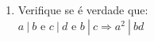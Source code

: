 \documentclass[a4paper,14pt]{article}
\begin{document}
\begin{multicols}{2}
\begin{enumerate}
			\item Verifique se é verdade que: \\
			$a~|~b$ e $c~|~d$ e $b~|~c \Rightarrow a^2~|~bd$ \\\\\\\\\\\\\\\\\\\\\\\\
		\end{enumerate}
		$~$ \\ $~$ \\ $~$ \\ $~$ \\ $~$ \\ $~$ \\ $~$ \\ $~$ \\ $~$ \\ $~$ \\ $~$ \\ $~$ \\ $~$ \\ $~$
	\end{multicols}
\end{document}
